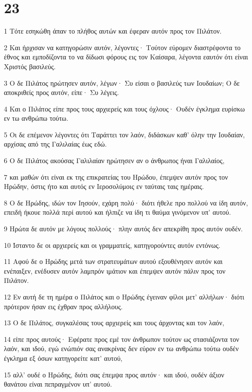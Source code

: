 \chapter{23}

\par 1 Τότε εσηκώθη άπαν το πλήθος αυτών και έφεραν αυτόν προς τον Πιλάτον.
\par 2 Και ήρχισαν να κατηγορώσιν αυτόν, λέγοντες· Τούτον εύρομεν διαστρέφοντα το έθνος και εμποδίζοντα το να δίδωσι φόρους εις τον Καίσαρα, λέγοντα εαυτόν ότι είναι Χριστός βασιλεύς.
\par 3 Ο δε Πιλάτος ηρώτησεν αυτόν, λέγων· Συ είσαι ο βασιλεύς των Ιουδαίων; Ο δε αποκριθείς προς αυτόν, είπε· Συ λέγεις.
\par 4 Και ο Πιλάτος είπε προς τους αρχιερείς και τους όχλους· Ουδέν έγκλημα ευρίσκω εν τω ανθρώπω τούτω.
\par 5 Οι δε επέμενον λέγοντες ότι Ταράττει τον λαόν, διδάσκων καθ' όλην την Ιουδαίαν, αρχίσας από της Γαλιλαίας έως εδώ.
\par 6 Ο δε Πιλάτος ακούσας Γαλιλαίαν ηρώτησεν αν ο άνθρωπος ήναι Γαλιλαίος,
\par 7 και μαθών ότι είναι εκ της επικρατείας του Ηρώδου, έπεμψεν αυτόν προς τον Ηρώδην, όστις ήτο και αυτός εν Ιεροσολύμοις εν ταύταις ταις ημέραις.
\par 8 Ο δε Ηρώδης, ιδών τον Ιησούν, εχάρη πολύ· διότι ήθελε προ πολλού να ίδη αυτόν, επειδή ήκουε πολλά περί αυτού και ήλπιζε να ίδη τι θαύμα γινόμενον υπ' αυτού.
\par 9 Ηρώτα δε αυτόν με λόγους πολλούς· πλην αυτός δεν απεκρίθη προς αυτόν ουδέν.
\par 10 Ίσταντο δε οι αρχιερείς και οι γραμματείς, κατηγορούντες αυτόν εντόνως.
\par 11 Αφού δε ο Ηρώδης μετά των στρατευμάτων αυτού εξουθένησεν αυτόν και ενέπαιξεν, ενέδυσεν αυτόν λαμπρόν ιμάτιον και έπεμψεν αυτόν πάλιν προς τον Πιλάτον.
\par 12 Εν αυτή δε τη ημέρα ο Πιλάτος και ο Ηρώδης έγειναν φίλοι μετ' αλλήλων· διότι πρότερον ήσαν εις έχθραν προς αλλήλους.
\par 13 Ο δε Πιλάτος, συγκαλέσας τους αρχιερείς και τους άρχοντας και τον λαόν,
\par 14 είπε προς αυτούς· Εφέρατε προς εμέ τον άνθρωπον τούτον ως στασιάζοντα τον λαόν, και ιδού, εγώ ενώπιόν σας ανακρίνας δεν εύρον εν τω ανθρώπω τούτω ουδέν έγκλημα εξ όσων κατηγορείτε κατ' αυτού,
\par 15 αλλ' ουδέ ο Ηρώδης, διότι σας έπεμψα προς αυτόν· και ιδού, ουδέν άξιον θανάτου είναι πεπραγμένον υπ' αυτού.

